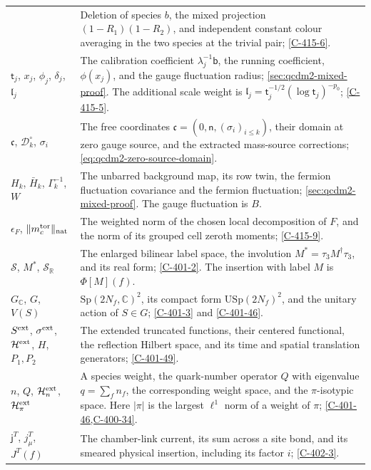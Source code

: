 \documentclass[11pt,letterpaper,reqno]{amsart}
\theoremstyle{definition}
\theoremstyle{remark}
\begin{document}
\begin{longtable}{@{}p{}@{\hspace{0.025\textwidth}}p{}@{}}
& Deletion of species $b$, the mixed projection
$(1-R_1)(1-R_2)$, and independent constant colour averaging
in the two species at the trivial pair; \cref{C-415-6}.\\
$\mathsf t_j$, $x_j$, $\phi_j$, $\delta_j$, $\mathfrak l_j$
& The calibration coefficient $\lambda_j^{-1}\mathsf b$,
the running coefficient, $\phi(x_j)$, and the gauge fluctuation
radius; \cref{sec:qcdm2-mixed-proof}. The additional scale weight is
$\mathfrak l_j=\mathsf t_j^{-1/2}(\log\mathsf t_j)^{-p_0}$;
\cref{C-415-5}.\\
$\mathfrak c$, $\mathscr D_k^\circ$, $\sigma_i$
& The free coordinates $\mathfrak c=(0,\mathsf n,(\sigma_i)_{i\le k})$,
their domain at zero gauge source,
and the extracted mass-source corrections;
\eqref{eq:qcdm2-zero-source-domain}.\\
$H_k$, $\bar H_k$, $\Gamma_k^{-1}$, $W$
& The unbarred background map, its row twin, the fermion
fluctuation covariance and the fermion fluctuation;
\cref{sec:qcdm2-mixed-proof}. The gauge fluctuation is $B$.\\
$\epsilon_F$, $\|m_c^{\rm tor}\|_{\rm nat}$
& The weighted norm of the chosen local decomposition of $F$,
and the norm of its grouped cell zeroth moments;
\cref{C-415-9}.\\
$\mathscr S$, $M^*$, $\mathscr S_{\mathbb R}$
& The enlarged bilinear label space, the involution
$M^*=\tau_3M^\dagger\tau_3$, and its real form;
\eqref{C-401-2}. The insertion with label $M$ is $\Phi[M](f)$.\\
$G_{\mathbb C}$, $G$, $V(S)$
& $\mathrm{Sp}(2N_f,\mathbb C)^2$, its compact form
$\mathrm{USp}(2N_f)^2$, and the unitary action of $S\in G$;
\eqref{C-401-3} and \cref{C-401-46}.\\
$S^{\rm ext}$, $\sigma^{\rm ext}$, $\mathcal H^{\rm ext}$,
$H$, $P_1,P_2$
& The extended truncated functions, their centered functional,
the reflection Hilbert space, and its time and spatial
translation generators; \cref{C-401-49}.\\
$n$, $Q$, $\mathcal H_n^{\rm ext}$, $\mathcal H_\pi^{\rm ext}$
& A species weight, the quark-number operator $Q$ with eigenvalue
$q=\sum_fn_f$,
the corresponding weight space, and the $\pi$-isotypic space.
Here $|\pi|$ is the largest $\ell^1$ norm of a weight of $\pi$;
\cref{C-401-46,C-400-34}.\\
$\mathsf j^T$, $j_\mu^T$, $J^T(f)$
& The chamber-link current, its sum across a site bond,
and its smeared physical insertion, including its factor $i$;
\eqref{C-402-3}.\\

\end{longtable}
\end{document}
